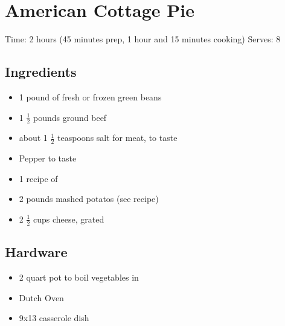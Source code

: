 \section{American Cottage Pie}
\label{americanCottagePie}
\setcounter{secnumdepth}{0}
Time: 2 hours (45 minutes prep, 1 hour and 15 minutes cooking)
Serves: 8

\begin{multicols}{2}
\subsection*{Ingredients}
\begin{itemize}
    \item 1 pound of fresh or frozen green beans
    \item 1 \( \frac{1}{2} \) pounds ground beef
    \item about 1 \( \frac{1}{2} \) teaspoons salt for meat, to taste
    \item Pepper to taste
    \item 1 recipe of 
    \item 2 pounds mashed potatos (see  recipe)
    \item 2 \( \frac{1}{2} \) cups cheese, grated
\end{itemize}

\subsection*{Hardware}
\begin{itemize}
    \item 2 quart pot to boil vegetables in
    \item Dutch Oven
    \item 9x13 casserole dish
\end{itemize}
\clearpage


\end{multicols}
